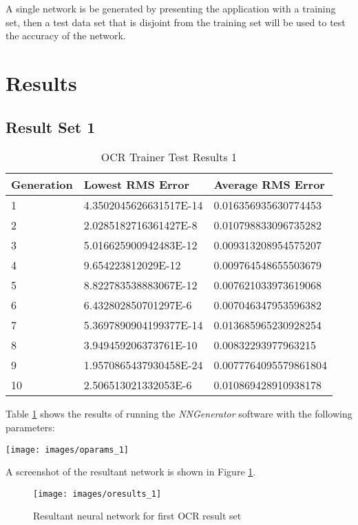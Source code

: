 A single network is be generated by presenting the application with a training set, then a test data set that is disjoint from the training set will be used to test the accuracy of the network.


\section{Results}  
\subsection{Result Set 1}

\begin{center}
    \begin{longtable}{ | l | l | l |}
      \caption{OCR Trainer Test Results 1} \label{ocr1} \\
    \hline
  Generation & Lowest RMS Error & Average RMS Error \\ \hline
1 &	4.3502045626631517E-14 &	0.016356935630774453 \\ \hline
2 &	2.0285182716361427E-8 &	0.010798833096735282 \\ \hline
3 &	5.016625900942483E-12 &	0.009313208954575207 \\ \hline
4 &	9.654223812029E-12 &	0.009764548655503679 \\ \hline
5 &	8.822783538883067E-12 &	0.007621033973619068 \\ \hline
6 &	6.432802850701297E-6 &	0.007046347953596382 \\ \hline
7 &	5.3697890904199377E-14 &	0.013685965230928254 \\ \hline
8 &	3.949459206373761E-10 &	0.00832293977963215 \\ \hline
9 &	1.9570865437930458E-24 &	0.0077764095579861804 \\ \hline
10 &	2.506513021332053E-6 &	0.010869428910938178 \\ \hline
\end{longtable}
\end{center}

Table \ref{ocr1} shows the results of running the {\it NNGenerator} software with the following parameters:

\begin{center}
\texttt{[image: images/oparams\_1]}
\end{center}

A screenshot of the resultant network is shown in Figure \ref{oresults_1}.

\begin{figure}[hbt!]
  \centering
  \texttt{[image: images/oresults\_1]}
  \caption{Resultant neural network for first OCR result set}
  \label{oresults_1}
\end{figure}

